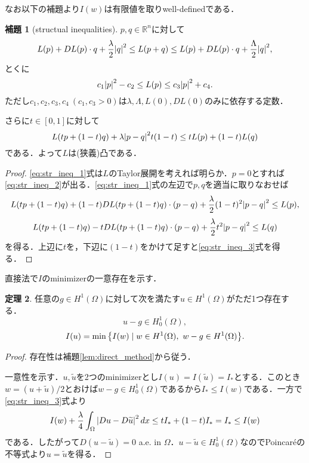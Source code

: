 \documentclass[a4paper]{ltjsarticle}
\newcommand{\Rset}{\mathbb{R}}
\newcommand{\Om}{\Omega}
\newcommand{\1}{\mathbbm{1}}
\numberwithin{equation}{section}
\theoremstyle{definition}
\newtheorem{thm}{定理}[section]
\newtheorem{lem}[thm]{補題}
\begin{document}
なお以下の補題より$I(w)$は有限値を取りwell-definedである．
\begin{lem}[structual inequalities]\label{lem:str_ineq}
    $p,q\in \Rset^n$に対して
    \begin{equation}
        L(p)+DL(p)\cdot q+\frac{\lambda}{2}\abs{q}^2\leq L(p+q)\leq L(p)+DL(p)\cdot q+\frac{\Lambda}{2}\abs{q}^2,\label{eq:str_ineq_1}
    \end{equation}
    とくに
    \begin{equation}
        c_1\abs{p}^2-c_2\leq L(p)\leq c_3\abs{p}^2+c_4 .\label{eq:str_ineq_2}
    \end{equation}
    ただし$c_1,c_2,c_3,c_4\ (c_1,c_3>0)$は$\lambda,\Lambda,L(0),DL(0)$のみに依存する定数．

    さらに$t\in[0,1]$に対して
    \begin{equation}
        L(tp+(1-t)q)+\lambda\abs{p-q}^2 t(1-t)\leq tL(p)+(1-t)L(q)\label{eq:str_ineq_3}
    \end{equation}
    である．よって$L$は(狭義)凸である．
\end{lem}
\begin{proof}
    \eqref{eq:str_ineq_1}式は$L$のTaylor展開を考えれば明らか．$p=0$とすれば\eqref{eq:str_ineq_2}が出る．\eqref{eq:str_ineq_1}式の左辺で$p,q$を適当に取りなおせば
    \begin{equation}
        L(tp+(1-t)q)+(1-t)DL(tp+(1-t)q)\cdot (p-q)+\frac{\lambda}{2}(1-t)^2\abs{p-q}^2\leq L(p),
    \end{equation}
    \begin{equation}
        L(tp+(1-t)q)-tDL(tp+(1-t)q)\cdot (p-q)+\frac{\lambda}{2}t^2\abs{p-q}^2\leq L(q)
    \end{equation}
    を得る．上辺に$t$を，下辺に$(1-t)$をかけて足すと\eqref{eq:str_ineq_3}式を得る．
\end{proof}
直接法で$I$のminimizerの一意存在を示す．
\begin{thm}\label{thm:existence_of_minimizer}
    任意の$g\in H^1(\Om)$に対して次を満たす$u\in H^1(\Om)$がただ1つ存在する．
    \begin{equation}
        u-g\in H^1_0(\Om),
    \end{equation}
    \begin{equation}
        I(u)=\min\qty{I(w)\mid w\in H^1(\Om),\ w-g\in H^1(\Om)}.
    \end{equation}
\end{thm}
\begin{proof}
    存在性は補題\ref{lem:direct_method}から従う．

    一意性を示す．$u,\widetilde{u}$を2つのminimizerとし$I(u)=I(\widetilde{u})=I_\ast$とする．このとき$w=(u+\widetilde{u})/2$とおけば$w-g\in H^1_0(\Om)$であるから$I_\ast\leq I(w)$である．一方で\eqref{eq:str_ineq_3}式より
    \begin{equation}
        I(w)+\frac{\lambda}{4}\int_{\Om}\abs{Du-D\widetilde{u}}^2\,dx\leq tI_\ast+(1-t)I_{\ast}=I_{\ast}\leq I(w)
    \end{equation}
    である．したがって$D(u-\widetilde{u})=0$ a.e. in $\Om$．$u-\widetilde{u}\in H^1_0(\Om)$なのでPoincar\'eの不等式より$u=\widetilde{u}$を得る．
\end{proof}
\end{document}
